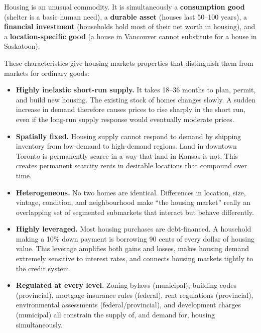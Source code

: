 Housing is an unusual commodity. It is simultaneously a \textbf{consumption
good} (shelter is a basic human need), a \textbf{durable asset} (houses last
50--100 years), a \textbf{financial investment} (households hold most of their
net worth in housing), and a \textbf{location-specific good} (a house in
Vancouver cannot substitute for a house in Saskatoon).

These characteristics give housing markets properties that distinguish them
from markets for ordinary goods:

\begin{itemize}
  \item \textbf{Highly inelastic short-run supply.} It takes 18--36 months
        to plan, permit, and build new housing. The existing stock of homes
        changes slowly. A sudden increase in demand therefore causes prices
        to rise sharply in the short run, even if the long-run supply
        response would eventually moderate prices.

  \item \textbf{Spatially fixed.} Housing supply cannot respond to demand
        by shipping inventory from low-demand to high-demand regions. Land
        in downtown Toronto is permanently scarce in a way that land in
        Kansas is not. This creates permanent scarcity rents in desirable
        locations that compound over time.

  \item \textbf{Heterogeneous.} No two homes are identical. Differences
        in location, size, vintage, condition, and neighbourhood make
        ``the housing market'' really an overlapping set of segmented
        submarkets that interact but behave differently.

  \item \textbf{Highly leveraged.} Most housing purchases are debt-financed.
        A household making a 10\% down payment is borrowing 90 cents of
        every dollar of housing value. This leverage amplifies both gains
        and losses, makes housing demand extremely sensitive to interest
        rates, and connects housing markets tightly to the credit system.

  \item \textbf{Regulated at every level.} Zoning bylaws (municipal),
        building codes (provincial), mortgage insurance rules (federal),
        rent regulations (provincial), environmental assessments
        (federal/provincial), and development charges (municipal) all
        constrain the supply of, and demand for, housing simultaneously.
\end{itemize}

